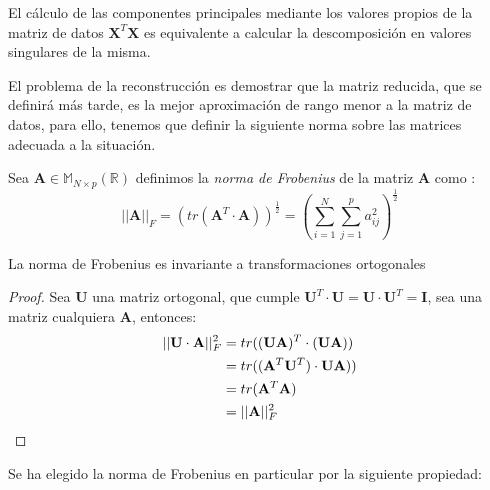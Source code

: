 \begin{coro}
El cálculo de las componentes principales mediante los valores propios de la matriz de datos $\mathbf{X}^T\mathbf{X}$ es equivalente a calcular la descomposición en valores singulares de la misma. 
\end{coro}
\noindent El problema de la reconstrucción es demostrar que la matriz reducida, que se definirá más tarde, es la mejor aproximación de rango menor a la matriz de datos, para ello, tenemos que definir la siguiente norma sobre las matrices adecuada a la situación. 

\begin{defi}
Sea $\textbf{A}\in \mathbb{M}_{N\times p}(\mathbb{R})$ definimos la \textit{norma de Frobenius} de la matriz \textbf{A} como \cite{Golub 1987}:
\begin{equation}
||\textbf{A}||_F=(tr(\textbf{A}^T\cdot \textbf{A}))^{\frac{1}{2}}=\left(\sum_{i=1}^{N}\sum _{j=1}^{p}a_{ij}^2\right)^{\frac{1}{2}}
\end{equation}
\end{defi}

\begin{propo}
La norma de Frobenius es invariante a transformaciones ortogonales
\begin{proof}
Sea $\mathbf{U}$ una matriz ortogonal, que cumple $\mathbf{U}^T\cdot \mathbf{U}=\mathbf{U}\cdot \mathbf{U}^T=\textbf{I}$, sea una matriz cualquiera $\mathbf{A}$, entonces:
\begin{align*}
||\mathbf{U} \cdot \mathbf{A}||_F^2&=tr((\mathbf{U} \mathbf{A})^T\cdot(\mathbf{U} \mathbf{A}))\\
&=tr((\mathbf{A}^T \mathbf{U}^T)\cdot \mathbf{U} \mathbf{A}))\\
&=tr(\mathbf{A}^T \mathbf{A})\\
&=||\mathbf{A}||_F^2\qedhere
\end{align*}
\end{proof}
\end{propo}

\noindent Se ha elegido la norma de Frobenius en particular por la siguiente propiedad:

